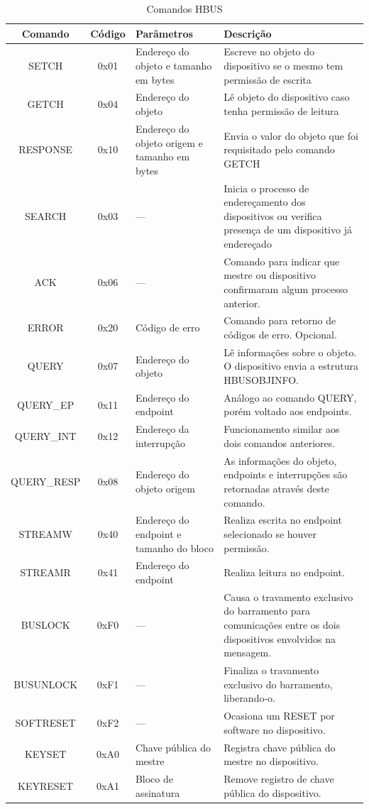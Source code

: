 \documentclass[11pt]{report}
\begin{document}
\begin{table}[H]
\centering
\caption{Comandos HBUS}
\begin{tabular}{c c p{4cm} p{6cm}}
\hline
Comando	 &	 Código 		&	Parâmetros				&	 Descrição\\
\hline
SETCH	&	0x01			&	Endereço	 do objeto e tamanho em bytes		&	Escreve no objeto do dispositivo se o mesmo tem permissão de escrita\\
GETCH	&	0x04			&	Endereço do objeto		&	Lê objeto do dispositivo caso tenha permissão de leitura\\
RESPONSE&	0x10			&	Endereço do objeto origem e tamanho em bytes & Envia o valor do objeto que foi requisitado pelo comando GETCH\\
SEARCH	&	0x03			&	---						&	Inicia o processo de endereçamento dos dispositivos ou verifica presença de um dispositivo já endereçado\\
ACK		&	0x06			&	---						&	Comando para indicar que mestre ou dispositivo confirmaram algum processo anterior.\\
ERROR	&	0x20			&	Código de erro			&	Comando para retorno de códigos de erro. Opcional.\\
QUERY	&	0x07		&	Endereço do objeto		&	Lê informações sobre o objeto. O dispositivo envia a estrutura HBUSOBJINFO.\\
QUERY\_EP &	0x11		&	Endereço do endpoint		&	Análogo ao comando QUERY, porém voltado aos endpoints.\\
QUERY\_INT&	0x12		&	Endereço da interrupção	&	Funcionamento similar aos dois comandos anteriores.\\
QUERY\_RESP & 0x08		&	Endereço do objeto origem & As informações do objeto, endpoints e interrupções são retornadas através deste comando.\\
STREAMW	&	0x40			&	Endereço do endpoint e tamanho do bloco		&	Realiza escrita no endpoint selecionado se houver permissão.\\
STREAMR	&	0x41			&	Endereço do endpoint		&	Realiza leitura no endpoint.\\
BUSLOCK	&	0xF0			&	---						& 	Causa o travamento exclusivo do barramento para comunicações entre os dois dispositivos envolvidos na mensagem.\\
BUSUNLOCK&	0xF1			&	---						&	Finaliza o travamento exclusivo do barramento, liberando-o.\\
SOFTRESET&	0xF2			&	---						&	Ocasiona um RESET por software no dispositivo.\\
KEYSET	&	0xA0			&	Chave pública do mestre	&	Registra chave pública do mestre no dispositivo.\\
KEYRESET	&	0xA1			&	Bloco de assinatura		&	Remove registro de chave pública do dispositivo.\\
\hline
\end{tabular}
\end{table}
\end{document}
